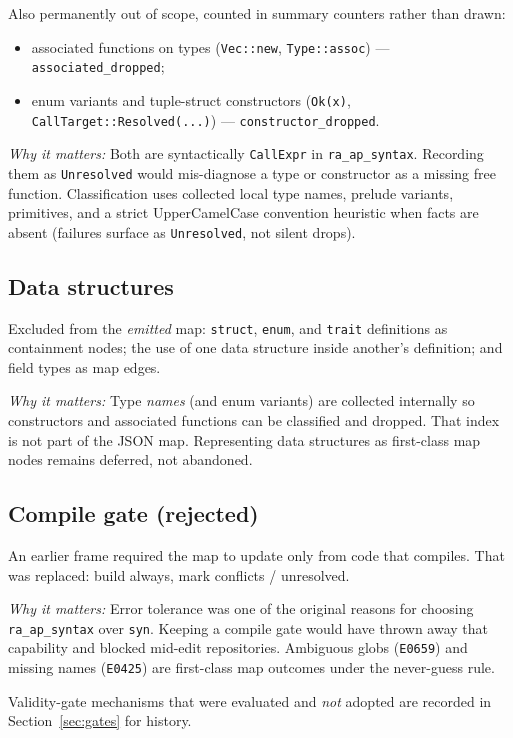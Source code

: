 \documentclass[11pt,a4paper]{article}
\newcommand{\note}{\par\smallskip\noindent\textit{Why it matters:} }
\begin{document}
Also permanently out of scope, counted in summary counters rather than drawn:

\begin{itemize}[nosep]
  \item associated functions on types (\verb|Vec::new|, \verb|Type::assoc|) ---
    \verb|associated_dropped|;
  \item enum variants and tuple-struct constructors (\verb|Ok(x)|,
    \verb|CallTarget::Resolved(...)|) --- \verb|constructor_dropped|.
\end{itemize}

\note{Both are syntactically \verb|CallExpr| in \verb|ra_ap_syntax|. Recording
them as \verb|Unresolved| would mis-diagnose a type or constructor as a missing
free function. Classification uses collected local type names, prelude variants,
primitives, and a strict UpperCamelCase convention heuristic when facts are
absent (failures surface as \verb|Unresolved|, not silent drops).}

\subsection{Data structures}

Excluded from the \emph{emitted} map: \verb|struct|, \verb|enum|, and
\verb|trait| definitions as containment nodes; the use of one data structure
inside another's definition; and field types as map edges.

\note{Type \emph{names} (and enum variants) are collected internally so
constructors and associated functions can be classified and dropped. That index
is not part of the JSON map. Representing data structures as first-class map
nodes remains deferred, not abandoned.}

\subsection{Compile gate (rejected)}

An earlier frame required the map to update only from code that compiles. That
was replaced: build always, mark conflicts / unresolved.

\note{Error tolerance was one of the original reasons for choosing
\verb|ra_ap_syntax| over \verb|syn|. Keeping a compile gate would have thrown
away that capability and blocked mid-edit repositories. Ambiguous globs
(\verb|E0659|) and missing names (\verb|E0425|) are first-class map outcomes
under the never-guess rule.}

Validity-gate mechanisms that were evaluated and \emph{not} adopted are recorded
in Section~\ref{sec:gates} for history.
\end{document}

